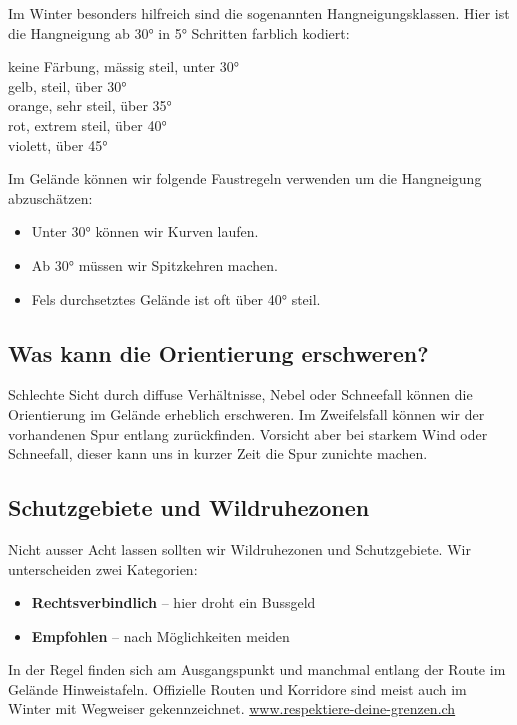 Im Winter besonders hilfreich sind die sogenannten Hangneigungsklassen.
Hier ist die Hangneigung ab 30° in 5° Schritten farblich kodiert:

\cbox[white]{10pt} keine Färbung, mässig steil, unter 30°\\
\cbox[above30]{10pt} gelb, steil, über 30°\\
\cbox[above35]{10pt} orange, sehr steil, über 35°\\
\cbox[above40]{10pt} rot, extrem steil, über 40°\\
\cbox[tooSteep]{10pt} violett, über 45°

Im Gelände können wir folgende Faustregeln verwenden um die Hangneigung abzuschätzen:

\begin{itemize}
  \item{Unter 30° können wir Kurven laufen.}
  \item{Ab 30° müssen wir Spitzkehren machen.}
  \item{Fels durchsetztes Gelände ist oft über 40° steil.}
\end{itemize}

\newcolumn

\subsection{Was kann die Orientierung erschweren?}

Schlechte Sicht durch diffuse Verhältnisse, Nebel oder Schneefall können die Orientierung im Gelände erheblich erschweren.
Im Zweifelsfall können wir der vorhandenen Spur entlang zurückfinden.
Vorsicht aber bei starkem Wind oder Schneefall, dieser kann uns in kurzer Zeit die Spur zunichte machen.

\subsection{Schutzgebiete und Wildruhezonen}

Nicht ausser Acht lassen sollten wir Wildruhezonen und Schutzgebiete.
Wir unterscheiden zwei Kategorien:

\begin{itemize}
  \item{\textbf{Rechtsverbindlich} -- hier droht ein Bussgeld}
  \item{\textbf{Empfohlen} -- nach Möglichkeiten meiden}
\end{itemize}

In der Regel finden sich am Ausgangspunkt und manchmal entlang der Route im Gelände Hinweistafeln.
Offizielle  Routen und Korridore sind meist auch im Winter mit Wegweiser gekennzeichnet.
\href{https://www.respektiere-deine-grenzen.ch/}{www.respektiere-deine-grenzen.ch}
